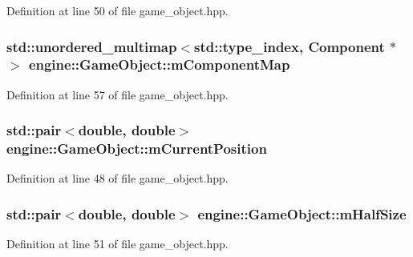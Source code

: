 Definition at line 50 of file game\+\_\+object.\+hpp.

\subsubsection[{\texorpdfstring{m\+Component\+Map}{mComponentMap}}]{\setlength{\rightskip}{0pt plus 5cm}std\+::unordered\+\_\+multimap$<$std\+::type\+\_\+index, {\bf Component} $\ast$$>$ engine\+::\+Game\+Object\+::m\+Component\+Map\hspace{0.3cm}{\ttfamily [protected]}}\hypertarget{classengine_1_1_game_object_a6a2bc7c46e6b3ebce8b8d5a4c152db71}{}\label{classengine_1_1_game_object_a6a2bc7c46e6b3ebce8b8d5a4c152db71}


Definition at line 57 of file game\+\_\+object.\+hpp.

\subsubsection[{\texorpdfstring{m\+Current\+Position}{mCurrentPosition}}]{\setlength{\rightskip}{0pt plus 5cm}std\+::pair$<$double, double$>$ engine\+::\+Game\+Object\+::m\+Current\+Position}\hypertarget{classengine_1_1_game_object_a0a4c0a35e88df30bef6e09df9b51e6bd}{}\label{classengine_1_1_game_object_a0a4c0a35e88df30bef6e09df9b51e6bd}


Definition at line 48 of file game\+\_\+object.\+hpp.

\subsubsection[{\texorpdfstring{m\+Half\+Size}{mHalfSize}}]{\setlength{\rightskip}{0pt plus 5cm}std\+::pair$<$double, double$>$ engine\+::\+Game\+Object\+::m\+Half\+Size}\hypertarget{classengine_1_1_game_object_a3d62630e8dc477795f8cc3923747aaba}{}\label{classengine_1_1_game_object_a3d62630e8dc477795f8cc3923747aaba}


Definition at line 51 of file game\+\_\+object.\+hpp.


